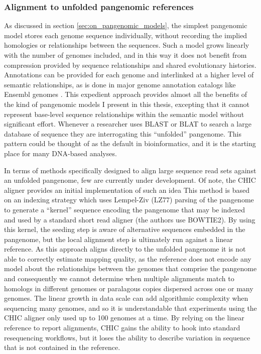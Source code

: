 \documentclass[a4paper,12pt,numbered,oneside]{Classes/PhDThesisPSnPDF}
\begin{document}
\subsubsection{Alignment to unfolded pangenomic references}

As discussed in section \ref{sec:on_pangenomic_models}, the simplest pangenomic model stores each genome sequence individually, without recording the implied homologies or relationships between the sequences.
Such a model grows linearly with the number of genomes included, and in this way it does not benefit from compression provided by sequence relationships and shared evolutionary histories.
Annotations can be provided for each genome and interlinked at a higher level of semantic relationships, as is done in major genome annotation catalogs like Ensembl genomes \cite{kersey2015ensembl}.
This expedient approach provides almost all the benefits of the kind of pangenomic models I present in this thesis, excepting that it cannot represent base-level sequence relationships within the semantic model without significant effort.
Whenever a researcher uses BLAST or BLAT to search a large database of sequence they are interrogating this ``unfolded'' pangenome.
This pattern could be thought of as the default in bioinformatics, and it is the starting place for many DNA-based analyses.

In terms of methods specifically designed to align large sequence read sets against an unfolded pangenome, few are currently under development.
Of note, the CHIC aligner provides an initial implementation of such an idea \cite{valenzuela2017chic}
This method is based on an indexing strategy which uses Lempel-Ziv (LZ77) \cite{ziv1977universal} parsing of the pangenome to generate a ``kernel'' sequence encoding the pangenome that may be indexed and used by a standard short read aligner (the authors use BOWTIE2).
By using this kernel, the seeding step is aware of alternative sequences embedded in the pangenome, but the local alignment step is ultimately run against a linear reference.
As this approach aligns directly to the unfolded pangenome it is not able to correctly estimate mapping quality, as the reference does not encode any model about the relationships between the genomes that comprise the pangenome and consequently we cannot determine when multiple alignments match to homologs in different genomes or paralagous copies dispersed across one or many genomes.
The linear growth in data scale can add algorithmic complexity when sequencing many genomes, and so it is understandable that experiments using the CHIC aligner only used up to 100 genomes at a time.
By relying on the linear reference to report alignments, CHIC gains the ability to hook into standard resequencing workflows, but it loses the ability to describe variation in sequence that is not contained in the reference.
\end{document}
